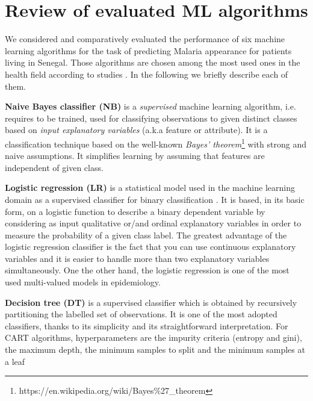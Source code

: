 \section{Review of evaluated ML algorithms}\label{ml_algorithms}
We considered and comparatively evaluated  the performance of six machine learning algorithms for the task of predicting Malaria appearance for patients living in Senegal. Those algorithms are chosen among the most used ones in the health field according to studies \cite{de2018binary,tomar2013survey}. In the following we briefly describe each of them.

\textbf{ Naive Bayes classifier (NB) }\cite{Ka17} is a \emph{supervised} machine learning algorithm, i.e. requires to be trained, used for classifying observations to given distinct classes based on \emph{input explanatory variables} (a.k.a feature or attribute).
It is a classification technique based on the well-known \emph{Bayes’ theorem}\footnote{https://en.wikipedia.org/wiki/Bayes\%27\_theorem} with strong and naive assumptions.
It simplifies learning by assuming that features are independent of given class.

 
\textbf{Logistic regression (LR)} \cite{Ph88} is a statistical model used in the machine learning domain as a supervised classifier for binary classification \cite{uddin2019comparing}. 
It is based, in its basic form, on a logistic function to describe a binary dependent variable\cite{wang2014support,de2018binary} by considering as input 
qualitative or/and ordinal explanatory variables  in order to measure the probability of a given class label. The greatest advantage  of the logistic regression
classifier is the fact that you can use continuous explanatory variables and it is easier to handle more than two explanatory variables simultaneously. One the other 
hand, the logistic regression is one of the most used multi-valued models in epidemiology.


\textbf{Decision tree (DT)} \cite{Ro05} is a supervised classifier which is obtained by recursively partitioning the labelled set of observations. It is one of the most adopted classifiers, thanks to its simplicity and its straightforward interpretation. For CART algorithms, hyperparameters are the impurity criteria (entropy and gini), the maximum depth, the minimum samples to split and the minimum samples at a leaf
 

